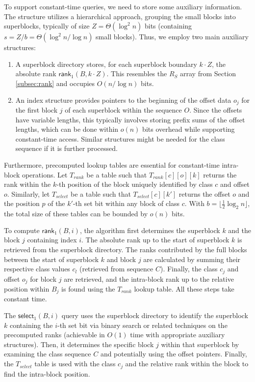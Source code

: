 To support constant-time queries, we need to store some auxiliary information. The structure utilizes a hierarchical approach, grouping the small blocks into superblocks, typically of size $Z = \Theta(\log^2 n)$ bits (containing $s = Z/b = \Theta(\log^2 n / \log n)$ small blocks). Thus, we employ two main auxiliary structures:
\begin{enumerate}
    \item A superblock directory stores, for each superblock boundary $k \cdot Z$, the absolute rank $\textsf{rank}_1(B, k \cdot Z)$. This resembles the $R_S$ array from Section \ref{subsec:rank} and occupies $O(n/\log n)$ bits.
    \item An index structure provides pointers to the beginning of the offset data $o_j$ for the first block $j$ of each superblock within the sequence $O$. Since the offsets have variable lengths, this typically involves storing prefix sums of the offset lengths, which can be done within $o(n)$ bits overhead while supporting constant-time access. Similar structures might be needed for the class sequence if it is further processed.
\end{enumerate}
Furthermore, precomputed lookup tables are essential for constant-time intra-block operations. Let $T_{rank}$ be a table such that $T_{rank}[c][o][k]$ returns the rank within the $k$-th position of the block uniquely identified by class $c$ and offset $o$. Similarly, let $T_{select}$ be a table such that $T_{select}[c][k']$ returns the offset $o$ and the position $p$ of the $k'$-th set bit within any block of class $c$. With $b = \lfloor \frac{1}{2}\log_2 n \rfloor$, the total size of these tables can be bounded by $o(n)$ bits.

To compute $\textsf{rank}_1(B, i)$, the algorithm first determines the superblock $k$ and the block $j$ containing index $i$. The absolute rank up to the start of superblock $k$ is retrieved from the superblock directory. The ranks contributed by the full blocks between the start of superblock $k$ and block $j$ are calculated by summing their respective class values $c_l$ (retrieved from sequence $C$). Finally, the class $c_j$ and offset $o_j$ for block $j$ are retrieved, and the intra-block rank up to the relative position within $B_j$ is found using the $T_{rank}$ lookup table. All these steps take constant time.

The $\textsf{select}_1(B, i)$ query uses the superblock directory to identify the superblock $k$ containing the $i$-th set bit via binary search or related techniques on the precomputed ranks (achievable in $O(1)$ time with appropriate auxiliary structures). Then, it determines the specific block $j$ within that superblock by examining the class sequence $C$ and potentially using the offset pointers. Finally, the $T_{select}$ table is used with the class $c_j$ and the relative rank within the block to find the intra-block position.

